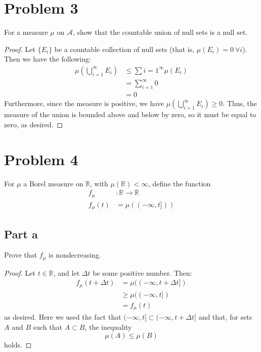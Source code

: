 \documentclass[fontsize=11pt]{scrartcl} %
\numberwithin{equation}{section} %
\numberwithin{figure}{section} %
\numberwithin{table}{section} %
\newcommand{\R}{\mathbb{R}}
\newcommand{\A}{\mathscr{A}}
\begin{document}
\section*{Problem 3}
For a measure $\mu$ on $\A$, show that the countable union of null sets is a null set.
\\
\begin{proof}
Let $\{E_i\}$ be a countable collection of null sets (that is, $\mu(E_i)=0\ \forall i$).
Then we have the following:
\[
\begin{aligned}
\mu\left(\bigcup_{i=1}^{\infty} E_i\right) &\leq \sum{i=1}^{\infty}\mu(E_i)\\
        &= \sum_{i=1}^{\infty}0\\
        &= 0
\end{aligned}
\]
Furthermore, since the measure is positive, we have
$\mu\left(\bigcup_{i=1}^{\infty} E_i\right) \geq 0$.
Thus, the measure of the union is bounded above and below by zero, so it must be equal
to zero, as desired.
\end{proof}
\section*{Problem 4}
For $\mu$ a Borel measure on $\R$, with $\mu(\R)<\infty$, define the function
\[
\begin{aligned}
f_{\mu}&: \R\to\R\\
f_{\mu}(t)&=\mu((-\infty,t]))
\end{aligned}
\]

\subsection*{Part a}
Prove that $f_{\mu}$ is nondecreasing.
\\
\begin{proof}
Let $t\in\R$, and let $\Delta t$ be some positive number. Then:
\[
\begin{aligned}
f_{\mu}(t+\Delta t) &= \mu((-\infty,t+\Delta t])\\
                    &\geq \mu((-\infty,t])\\
                    &= f_{\mu}(t)
\end{aligned}
\]
as desired. Here we used the fact that $(-\infty,t] \subset (-\infty,t+\Delta t]$ and that,
for sets $A$ and $B$ such that $A\subset B$, the inequality
\[
\mu(A) \leq \mu(B)
\]
holds.
\end{proof}
\end{document}
